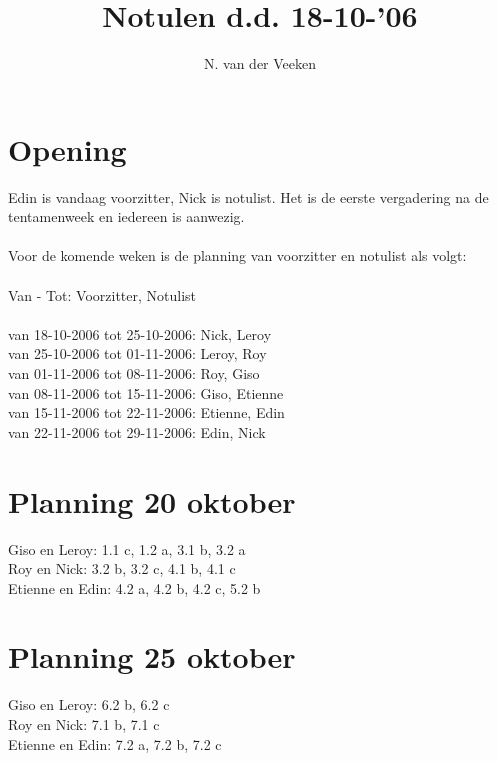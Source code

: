 \documentclass[11pt]{article}
\title{Notulen d.d. 18-10-'06}
\author{N. van der Veeken}
\begin{document}
\maketitle

\section{Opening}
Edin is vandaag voorzitter, Nick is notulist. Het is de eerste
vergadering na de tentamenweek en iedereen is aanwezig.\\
\\
Voor de komende weken is de planning van voorzitter en notulist als
volgt:\\
\\
Van - Tot: Voorzitter, Notulist\\
\\
van 18-10-2006 tot 25-10-2006: Nick, Leroy\\
van 25-10-2006 tot 01-11-2006: Leroy, Roy\\
van 01-11-2006 tot 08-11-2006: Roy, Giso\\
van 08-11-2006 tot 15-11-2006: Giso, Etienne\\
van 15-11-2006 tot 22-11-2006: Etienne, Edin\\
van 22-11-2006 tot 29-11-2006: Edin, Nick

\section{Planning 20 oktober}
Giso en Leroy: 1.1 c, 1.2 a, 3.1 b, 3.2 a\\
Roy en Nick: 3.2 b, 3.2 c, 4.1 b, 4.1 c\\
Etienne en Edin: 4.2 a, 4.2 b, 4.2 c, 5.2 b\\

\section{Planning 25 oktober}
Giso en Leroy: 6.2 b, 6.2 c\\
Roy en Nick: 7.1 b, 7.1 c\\
Etienne en Edin: 7.2 a, 7.2 b, 7.2 c\\
\end{document}
